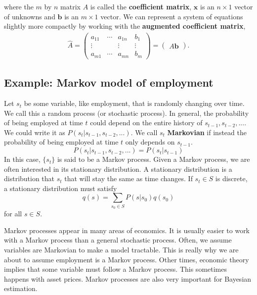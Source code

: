 \documentclass[12pt,reqno]{amsart}
\theoremstyle{definition}
\begin{document}
where the $m$ by $n$ matrix $A$ is called the \textbf{coefficient
  matrix}, $\mathbf{x}$ is an $n\times 1$ vector of unknowns and
$\mathbf{b}$ is an $m \times 1$ vector.  We can represent a system of
equations slightly more compactly by working with the
\textbf{augmented coefficient matrix},
\begin{align*}
  \hat{A} =   \begin{pmatrix} a_{11} &  \cdots & a_{1n} & b_1 \\
    \vdots & & \vdots & \vdots \\
    a_{m1} & \cdots & a_{mn} & b_m 
  \end{pmatrix}  = \begin{pmatrix} A \mathbf{b}
  \end{pmatrix}.
\end{align*}

\subsection*{Example: Markov model of employment}

Let $s_t$ be some variable, like employment, that is randomly changing
over time. We call this a random process (or stochastic process). In
general, the probability of being employed at time $t$ could depend on
the entire history of $s_{t-1}, s_{t-2}, ...$. We could write it as
$P(s_t|s_{t-1}, s_{t-2}, ...)$. We call $s_t$ \textbf{Markovian} if
instead the probability of being employed at time $t$ only depends on
$s_{t-1}$.
\[ P(s_t|s_{t-1}, s_{t-2}, ...) = P(s_t | s_{t-1}) \] In this case,
$\{s_t\}$ is said to be a Markov process. Given a Markov process, we
are often interested in its stationary distribution. A stationary
distribution is a distribution that $s_t$ that will stay the same as
time changes. If $s_t \in S$ is discrete, a stationary distribution
must satisfy 
\[ q(s) = \sum_{s_0 \in S} P(s|s_0)q(s_0) \]
for all $s \in S$. 

Markov processes appear in many areas of economics. It is usually
easier to work with a Markov process than a general stochastic
process.  Often, we assume variables are Markovian to make a model
tractable. This is really why we are about to assume employment is a
Markov process. Other times, economic theory implies that some
variable must follow a Markov process. This sometimes happens with
asset prices. Markov processes are also very important for Bayesian
estimation.
\end{document}
